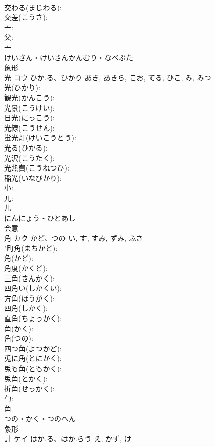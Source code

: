 \documentclass[8pt]{extreport}
\begin{document}
\begin{CJK}{UTF8}{min}
\\	交わる(まじわる): 
\\	交差(こうさ): 
\\	亠: 
\\	父: 
\\	亠	
\\	けいさん・けいさんかんむり・なべぶた	
\\	象形 
\\	光	コウ	ひか.る、ひかり	あき, あきら, こお, てる, ひこ, み, みつ	
\\	光(ひかり): 
\\	観光(かんこう): 
\\	光景(こうけい): 
\\	日光(にっこう): 
\\	光線(こうせん): 
\\	蛍光灯(けいこうとう): 
\\	光る(ひかる): 
\\	光沢(こうたく): 
\\	光熱費(こうねつひ): 
\\	稲光(いなびかり): 
\\	小: 
\\	兀: 
\\	儿	
\\	にんにょう・ひとあし	
\\	会意 
\\	角	カク	かど、つの	い, す, すみ, ずみ, ふさ	
\\	"町角(まちかど): 
\\	角(かど): 
\\	角度(かくど): 
\\	三角(さんかく): 
\\	四角い(しかくい): 
\\	方角(ほうがく): 
\\	四角(しかく): 
\\	直角(ちょっかく): 
\\	角(かく): 
\\	角(つの): 
\\	四つ角(よつかど): 
\\	兎に角(とにかく): 
\\	兎も角(ともかく): 
\\	兎角(とかく): 
\\	折角(せっかく): 
\\	勹: 
\\	角	
\\	つの・かく・つのへん	
\\	象形 
\\	計	ケイ	はか.る、はか.らう	え, かず, け	

\end{CJK}
\end{document}
